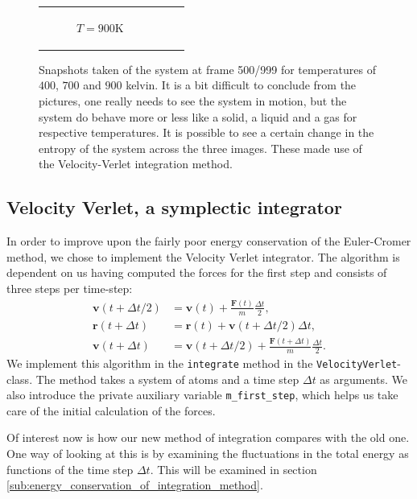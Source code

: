 \documentclass[a4paper]{article}
\renewcommand{\vec}[1]{\mathbf{#1}}
\begin{document}
\begin{figure}
\begin{tabular}[c]{ccc}
\begin{subfigure}[c]{0.32\textwidth}
                \caption{$T = 900$K}
            \end{subfigure}
        \end{tabular}
        \caption[Argon phases]{Snapshots taken of the system at frame 500/999
            for temperatures of $400$, $700$ and $900$ kelvin. It is a bit
            difficult to conclude from the pictures, one really needs to see
            the system in motion, but the system do behave more or less like a
            solid, a liquid and a gas for respective temperatures. It is
        possible to see a certain change in the entropy of the system across
    the three images. These made use of the Velocity-Verlet integration
method.}
        \label{fig:potential_iteration}
    \end{figure}

\subsection{Velocity Verlet, a symplectic integrator}
\label{sub:velocity_verlet_a_symplectic_integrator}
    
    In order to improve upon the fairly poor energy conservation of the
    Euler-Cromer method, we chose to implement the Velocity Verlet integrator.
    The algorithm is dependent on us having computed the forces for the first
    step and consists of three steps per time-step:
    \begin{align*}
        \vec{v}(t + \Delta t/2) &= \vec{v}(t) + \frac{\vec{F}(t)}{m}\frac{\Delta t}{2},\\
        \vec{r}(t + \Delta t) &= \vec{r}(t) + \vec{v}(t + \Delta t/2)\Delta t, \\
        \vec{v}(t + \Delta t) &= \vec{v}(t + \Delta t/2) + \frac{\vec{F}(t+\Delta t)}{m} \frac{\Delta t}{2}.
    \end{align*}
    We implement this algorithm in the \texttt{integrate} method in the
    \texttt{VelocityVerlet}-class. The method takes a system of atoms and a
    time step $\Delta t$ as arguments. We also introduce the private auxiliary
    variable \texttt{m\_first\_step}, which helps us take care of the initial
    calculation of the forces.
    
    Of interest now is how our new method of integration compares with the old
    one. One way of looking at this is by examining the fluctuations in the
    total energy as functions of the time step $\Delta t$. This will be
    examined in section \ref{sub:energy_conservation_of_integration_method}.
\end{document}
